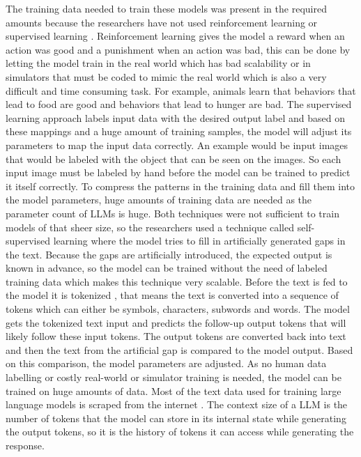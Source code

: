 \documentclass[draft,final]{thesisclass} %
\begin{document}
The training data needed to train these models was present in the required amounts because the researchers have not used reinforcement learning \parencite{rl_bible} or supervised learning \parencite[3]{sl_bible}.
Reinforcement learning gives the model a reward when an action was good and a punishment when an action was bad, this can be done by letting the model train in the real world which has bad scalability or in simulators that must be coded to mimic the real world which is also a very difficult and time consuming task.
For example, animals learn that behaviors that lead to food are good and behaviors that lead to hunger are bad.
The supervised learning approach labels input data with the desired output label and based on these mappings and a huge amount of training samples, the model will adjust its parameters to map the input data correctly.
An example would be input images that would be labeled with the object that can be seen on the images. So each input image must be labeled by hand before the model can be trained to predict it itself correctly.
To compress the patterns in the training data and fill them into the model parameters, huge amounts of training data are needed as the parameter count of \acs{LLM}s is huge.
Both techniques were not sufficient to train models of that sheer size, so the researchers used a technique called self-supervised learning \parencite[7]{llm_literature_review} where the model tries to fill in artificially generated gaps in the text.
Because the gaps are artificially introduced, the expected output is known in advance, so the model can be trained without the need of labeled training data which makes this technique very scalable.
Before the text is fed to the model it is tokenized \parencite[4]{llm_literature_review}, that means the text is converted into a sequence of tokens which can either be symbols, characters, subwords and words.
The model gets the tokenized text input and predicts the follow-up output tokens that will likely follow these input tokens. The output tokens are converted back into text and then the text from the artificial gap is compared to the model output.
Based on this comparison, the model parameters are adjusted. As no human data labelling or costly real-world or simulator training is needed, the model can be trained on huge amounts of data.
Most of the text data used for training large language models is scraped from the internet \parencite[1]{llm_literature_review}.
The context size of a \acs{LLM} is the number of tokens that the model can store in its internal state while generating the output tokens, so it is the history of tokens it can access while generating the response.
\end{document}
